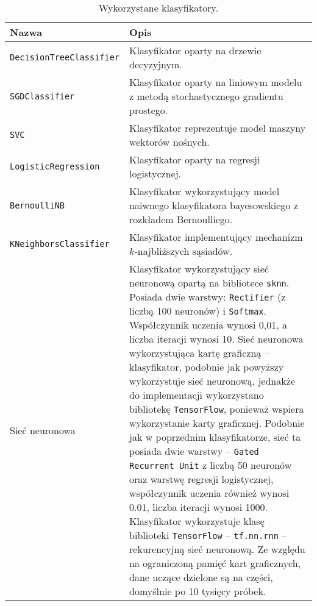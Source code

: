 	\begin{table}[H]
		\centering
		\caption{Wykorzystane klasyfikatory.}
		\begin{tabular}{p{5cm}p{11cm}}
			\toprule
			\textbf{Nazwa} & \textbf{Opis} \\
			\midrule
			\texttt{DecisionTreeClassifier} & Klasyfikator oparty na drzewie decyzyjnym. \\
			\texttt{SGDClassifier} & Klasyfikator oparty na liniowym modelu z metodą stochastycznego gradientu prostego. \\
			\texttt{SVC} & Klasyfikator reprezentuje model maszyny wektorów nośnych. \\
			\texttt{LogisticRegression} & Klasyfikator oparty na regresji logistycznej. \\
			\texttt{BernoulliNB} & Klasyfikator wykorzystujący model naiwnego klasyfikatora bayesowskiego z rozkładem Bernoulliego. \\
			\texttt{KNeighborsClassifier} & Klasyfikator implementujący mechanizm $k$-najbliższych sąsiadów. \\
			Sieć neuronowa & Klasyfikator wykorzystujący sieć neuronową opartą na bibliotece \texttt{sknn}. Posiada dwie warstwy: \texttt{Rectifier} (z liczbą 100 neuronów) i \texttt{Softmax}. Współczynnik uczenia wynosi 0,01, a liczba iteracji wynosi 10.
			Sieć neuronowa wykorzystująca kartę graficzną -- klasyfikator, podobnie jak powyższy wykorzystuje sieć neuronową, jednakże do implementacji wykorzystano bibliotekę \texttt{TensorFlow}, ponieważ wspiera wykorzystanie karty graficznej. Podobnie jak w poprzednim klasyfikatorze, sieć ta posiada dwie warstwy -- \texttt{Gated Recurrent Unit} z liczbą 50 neuronów oraz warstwę regresji logistycznej, współczynnik uczenia również wynosi 0.01, liczba iteracji wynosi 1000. Klasyfikator wykorzystuje klasę biblioteki \texttt{TensorFlow} -- \texttt{tf.nn.rnn} -- rekurencyjną sieć neuronową. Ze względu na ograniczoną pamięć kart graficznych, dane uczące dzielone są na części, domyślnie po 10 tysięcy próbek. \\
			\bottomrule
		\end{tabular}
	\end{table}